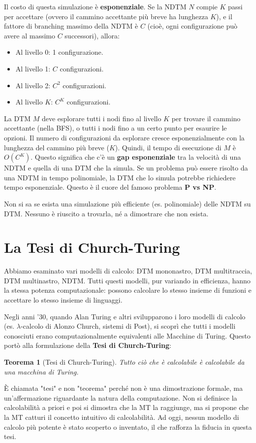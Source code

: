 \documentclass[a4paper, 11pt]{book} %
\newtheorem{theorem}{Teorema}[section]
\theoremstyle{definition}
\begin{document}
Il costo di questa simulazione è \textbf{esponenziale}. Se la NDTM $N$ compie $K$ passi per accettare (ovvero il cammino accettante più breve ha lunghezza $K$), e il fattore di branching massimo della NDTM è $C$ (cioè, ogni configurazione può avere al massimo $C$ successori), allora:
\begin{itemize}
    \item Al livello 0: 1 configurazione.
    \item Al livello 1: $C$ configurazioni.
    \item Al livello 2: $C^2$ configurazioni.
    \item Al livello $K$: $C^K$ configurazioni.
\end{itemize}
La DTM $M$ deve esplorare tutti i nodi fino al livello $K$ per trovare il cammino accettante (nella BFS), o tutti i nodi fino a un certo punto per esaurire le opzioni. Il numero di configurazioni da esplorare cresce esponenzialmente con la lunghezza del cammino più breve ($K$). Quindi, il tempo di esecuzione di $M$ è $O(C^K)$.
Questo significa che c'è un \textbf{gap esponenziale} tra la velocità di una NDTM e quella di una DTM che la simula. Se un problema può essere risolto da una NDTM in tempo polinomiale, la DTM che lo simula potrebbe richiedere tempo esponenziale. Questo è il cuore del famoso problema \textbf{P vs NP}.

Non si sa se esista una simulazione più efficiente (es. polinomiale) delle NDTM su DTM. Nessuno è riuscito a trovarla, né a dimostrare che non esista.

\section{La Tesi di Church-Turing}

Abbiamo esaminato vari modelli di calcolo: DTM mononastro, DTM multitraccia, DTM multinastro, NDTM. Tutti questi modelli, pur variando in efficienza, hanno la stessa potenza computazionale: possono calcolare lo stesso insieme di funzioni e accettare lo stesso insieme di linguaggi.

Negli anni '30, quando Alan Turing e altri svilupparono i loro modelli di calcolo (es. $\lambda$-calcolo di Alonzo Church, sistemi di Post), si scoprì che tutti i modelli conosciuti erano computazionalmente equivalenti alle Macchine di Turing. Questo portò alla formulazione della \textbf{Tesi di Church-Turing}:

\begin{theorem}[Tesi di Church-Turing]
\emph{Tutto ciò che è calcolabile è calcolabile da una macchina di Turing.}
\end{theorem}
È chiamata "tesi" e non "teorema" perché non è una dimostrazione formale, ma un'affermazione riguardante la natura della computazione. Non si definisce la calcolabilità a priori e poi si dimostra che la MT la raggiunge, ma si propone che la MT catturi il concetto intuitivo di calcolabilità. Ad oggi, nessun modello di calcolo più potente è stato scoperto o inventato, il che rafforza la fiducia in questa tesi.
\end{document}
